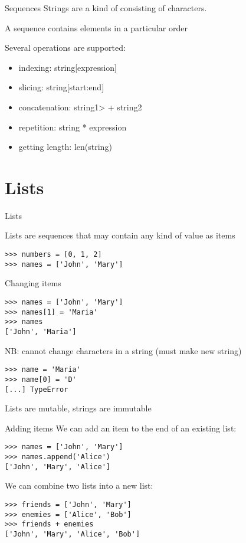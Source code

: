 \documentclass{beamer}
\begin{document}
\begin{frame}{Sequences}
    Strings are a kind of 
    consisting of characters.

    A sequence contains elements in a particular order

    Several operations are supported:
    \begin{itemize}
        \item indexing:                    string[expression]
        \item slicing:                     string[start:end]
        \item concatenation:               string1> + string2
        \item repetition:                  string * expression
        \item getting length:              len(string)
    \end{itemize}
\end{frame}


\frame{\tableofcontents[currentsection]}
\section{Lists}

\begin{frame}[fragile]{Lists}
    \begin{definition}
    Lists are sequences that may contain any kind of value as items
    \end{definition}
\begin{lstlisting} 
>>> numbers = [0, 1, 2]
>>> names = ['John', 'Mary']
\end{lstlisting} 
\end{frame}

\begin{frame}[fragile]{Changing items}
\begin{lstlisting} 
>>> names = ['John', 'Mary']
>>> names[1] = 'Maria'
>>> names
['John', 'Maria']
\end{lstlisting} 

\pause
NB: cannot change characters in a string (must make new string)
\begin{lstlisting} 
>>> name = 'Maria'
>>> name[0] = 'D'
[...] TypeError
\end{lstlisting}

Lists are mutable, strings are immutable
\end{frame}


\begin{frame}[fragile]{Adding items}
We can add an item to the end of an existing list:
\begin{lstlisting} 
>>> names = ['John', 'Mary']
>>> names.append('Alice')
['John', 'Mary', 'Alice']
\end{lstlisting}

\pause
We can combine two lists into a new list:
\begin{lstlisting} 
>>> friends = ['John', 'Mary']
>>> enemies = ['Alice', 'Bob']
>>> friends + enemies
['John', 'Mary', 'Alice', 'Bob']
\end{lstlisting}
\end{frame}
\end{document}
